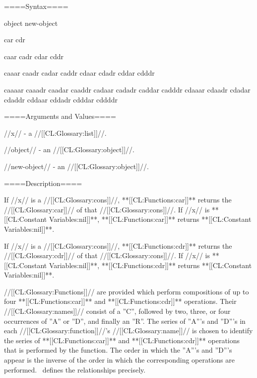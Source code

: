 
====Syntax====

 {object} {new-object} {car cdr

caar cadr cdar cddr

caaar caadr cadar caddr cdaar cdadr cddar cdddr

caaaar caaadr caadar caaddr cadaar cadadr caddar cadddr cdaaar cdaadr cdadar cdaddr cddaar cddadr cdddar cddddr}

====Arguments and Values====

//x// - a //[[CL:Glossary:list]]//.

//object// - an //[[CL:Glossary:object]]//.

//new-object// - an //[[CL:Glossary:object]]//.

====Description====

If //x// is a //[[CL:Glossary:cons]]//, **[[CL:Functions:car]]** returns the //[[CL:Glossary:car]]// of that //[[CL:Glossary:cons]]//. If //x// is **[[CL:Constant Variables:nil]]**, **[[CL:Functions:car]]** returns **[[CL:Constant Variables:nil]]**.

If //x// is a //[[CL:Glossary:cons]]//, **[[CL:Functions:cdr]]** returns the //[[CL:Glossary:cdr]]// of that //[[CL:Glossary:cons]]//. If //x// is **[[CL:Constant Variables:nil]]**, **[[CL:Functions:cdr]]** returns **[[CL:Constant Variables:nil]]**.

//[[CL:Glossary:Functions]]// are provided which perform compositions of up to four **[[CL:Functions:car]]** and **[[CL:Functions:cdr]]** operations. Their //[[CL:Glossary:names]]// consist of a ''C'', followed by two, three, or four occurrences of ''A'' or ''D'', and finally an ''R''. The series of ''A'''s and ''D'''s in each //[[CL:Glossary:function]]//'s //[[CL:Glossary:name]]// is chosen to identify the series of **[[CL:Functions:car]]** and **[[CL:Functions:cdr]]** operations that is performed by the function. The order in which the ''A'''s and ''D'''s appear is the inverse of the order in which the corresponding operations are performed. \Thenextfigure\ defines the relationships precisely.

